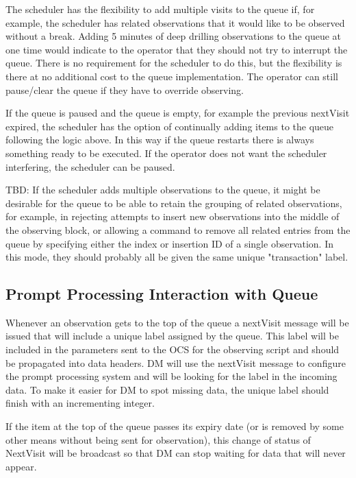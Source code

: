 \documentclass[TS,toc,lsstdraft]{lsstdoc}
\begin{document}
The scheduler has the flexibility to add multiple visits to the queue if, for example, the scheduler has related observations that it would like to be observed without a break.
Adding 5 minutes of deep drilling observations to the queue at one time would indicate to the operator that they should not try to interrupt the queue.
There is no requirement for the scheduler to do this, but the flexibility is there at no additional cost to the queue implementation.
The operator can still pause/clear the queue if they have to override observing.

If the queue is paused and the queue is empty, for example the previous nextVisit expired, the scheduler has the option of continually adding items to the queue following the logic above.
In this way if the queue restarts there is always something ready to be executed.
If the operator does not want the scheduler interfering, the scheduler can be paused.

TBD: If the scheduler adds multiple observations to the queue, it might be desirable for the queue to be able to retain the grouping of related observations, for example, in rejecting attempts to insert new observations into the middle of the observing block, or allowing a command to remove all related entries from the queue by specifying either the index or insertion ID of a single observation.
In this mode, they should probably all be given the same unique "transaction" label.

\subsection{Prompt Processing Interaction with Queue}

Whenever an observation gets to the top of the queue a nextVisit message will be issued that will include a unique label assigned by the queue.
This label will be included in the parameters sent to the OCS for the observing script and should be propagated into data headers.
DM will use the nextVisit message to configure the prompt processing system and will be looking for the label in the incoming data.
To make it easier for DM to spot missing data, the unique label should finish with an incrementing integer.

If the item at the top of the queue passes its expiry date (or is removed by some other means without being sent for observation), this change of status of NextVisit will be broadcast so that DM can stop waiting for data that will never appear.
\end{document}
